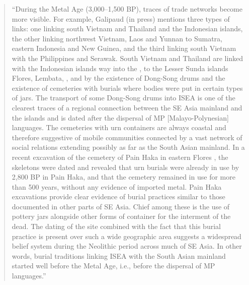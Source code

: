 \begin{quote}
``During the Metal Age ({\tl}3,000--1,500 BP),
traces of trade networks become more visible.
For example, Galipaud (in press) mentions three types of links: one linking south
Vietnam and Thailand and the Indonesian islands,
the other linking northwest Vietnam,
Laos and Yunnan to Sumatra,
eastern Indonesia and New Guinea, and the third linking south Vietnam with the Philippines and Serawak.
South Vietnam and Thailand are linked with the Indonesian islands way into the ,
to the Lesser Sunda islands Flores,
Lembata, , and  by the existence of Dong-Song drums
and the existence of cemeteries with burials where bodies were put in certain types of jars.
The transport of some Dong-Song drums into ISEA is one of the clearest traces of
a regional connection between the SE Asia mainland
and the islands and is dated after the dispersal of MP [Malayo-Polynesian] languages.
The cemeteries with urn containers are always coastal
and therefore suggestive of mobile communities connected by a vast network of social
relations extending possibly as far as the South Asian mainland.
In a recent excavation of the cemetery of Pain Haka in eastern Flores
\citep{GalipaudBuckley2016}, the skeletons were dated
and revealed that urn burials were already in use by 2,800 BP in Pain Haka,
and that the cemetery remained in use for more than 500 years,
without any evidence of imported metal.
Pain Haka excavations provide clear evidence of burial practices similar to those
documented in other parts of SE Asia.
Chief among these is the use of pottery jars alongside other forms of container for
the interment of the dead.
The dating of the site combined with the fact that this burial practice is present
over such a wide geographic area suggests a widespread belief system during the Neolithic
period across much of SE Asia.
In other words, burial traditions linking ISEA with the South Asian mainland
started well before the Metal Age,
i.e., before the dispersal of MP languages.'' \citep[17]{Klamer2019}
\end{quote}

